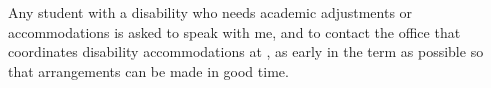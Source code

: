 Any student with a disability who needs academic adjustments or accommodations
is asked to speak with me, and to contact the office that coordinates disability
accommodations at \GetInstitution, as early in the term as possible so that
arrangements can be made in good time.
